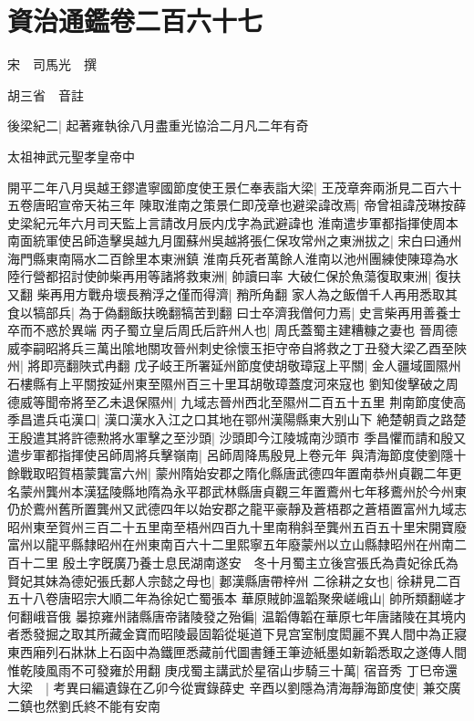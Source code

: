 \chapter{資治通鑑卷二百六十七}
宋　司馬光　撰

胡三省　音註

後梁紀二|{
	起著雍執徐八月盡重光協洽二月凡二年有奇}


太祖神武元聖孝皇帝中

開平二年八月吳越王鏐遣寧國節度使王景仁奉表詣大梁|{
	王茂章奔兩浙見二百六十五卷唐昭宣帝天祐三年}
陳取淮南之策景仁即茂章也避梁諱改焉|{
	帝曾祖諱茂琳按薛史梁紀元年六月司天監上言請改月辰内戊字為武避諱也}
淮南遣步軍都指揮使周本南面統軍使呂師造擊吳越九月圍蘇州吳越將張仁保攻常州之東洲拔之|{
	宋白曰通州海門縣東南隔水二百餘里本東洲鎮}
淮南兵死者萬餘人淮南以池州團練使陳璋為水陸行營都招討使帥柴再用等諸將救東洲|{
	帥讀曰率}
大破仁保於魚蕩復取東洲|{
	復扶又翻}
柴再用方戰舟壞長矟浮之僅而得濟|{
	矟所角翻}
家人為之飯僧千人再用悉取其食以犒部兵|{
	為于偽翻飯扶晚翻犒苦到翻}
曰士卒濟我僧何力焉|{
	史言柴再用善養士卒而不惑於異端}
丙子蜀立皇后周氏后許州人也|{
	周氏蓋蜀主建糟糠之妻也}
晉周德威李嗣昭將兵三萬出隂地關攻晉州刺史徐懷玉拒守帝自將救之丁丑發大梁乙酉至陜州|{
	將即亮翻陜式冉翻}
戊子岐王所署延州節度使胡敬璋寇上平關|{
	金人疆域圖隰州石樓縣有上平關按延州東至隰州百三十里耳胡敬璋蓋度河來寇也}
劉知俊擊破之周德威等聞帝將至乙未退保隰州|{
	九域志晉州西北至隰州二百五十五里}
荆南節度使高季昌遣兵屯漢口|{
	漢口漢水入江之口其地在鄂州漢陽縣東大别山下}
絶楚朝貢之路楚王殷遣其將許德勲將水軍擊之至沙頭|{
	沙頭即今江陵城南沙頭市}
季昌懼而請和殷又遣步軍都指揮使呂師周將兵擊嶺南|{
	呂師周降馬殷見上卷元年}
與清海節度使劉隱十餘戰取昭賀梧蒙龔富六州|{
	蒙州隋始安郡之隋化縣唐武德四年置南恭州貞觀二年更名蒙州龔州本漢猛陵縣地隋為永平郡武林縣唐貞觀三年置鷰州七年移鷰州於今州東仍於鷰州舊所置龔州又武德四年以始安郡之龍平豪靜及蒼梧郡之蒼梧置富州九域志昭州東至賀州三百二十五里南至梧州四百九十里南稍斜至龔州五百五十里宋開寶廢富州以龍平縣隸昭州在州東南百六十二里熙寧五年廢蒙州以立山縣隸昭州在州南二百十二里}
殷土字旣廣乃養士息民湖南遂安　冬十月蜀主立後宫張氏為貴妃徐氏為賢妃其妹為德妃張氏郪人宗懿之母也|{
	郪漢縣唐帶梓州}
二徐耕之女也|{
	徐耕見二百五十八卷唐昭宗大順二年為徐妃亡蜀張本}
華原賊帥溫韜聚衆嵯峨山|{
	帥所類翻嵯才何翻峨音俄}
㬥掠雍州諸縣唐帝諸陵發之殆徧|{
	温韜傳韜在華原七年唐諸陵在其境内者悉發掘之取其所藏金寶而昭陵最固韜從埏道下見宫室制度閎麗不異人間中為正寢東西廂列石牀牀上石函中為鐵匣悉藏前代圖書鍾王筆迹紙墨如新韜悉取之遂傳人間惟乾陵風雨不可發雍於用翻}
庚戌蜀主講武於星宿山步騎三十萬|{
	宿音秀}
丁巳帝還大梁　|{
	考異曰編遺錄在乙卯今從實錄薛史}
辛酉以劉隱為清海靜海節度使|{
	兼交廣二鎮也然劉氏終不能有安南}
